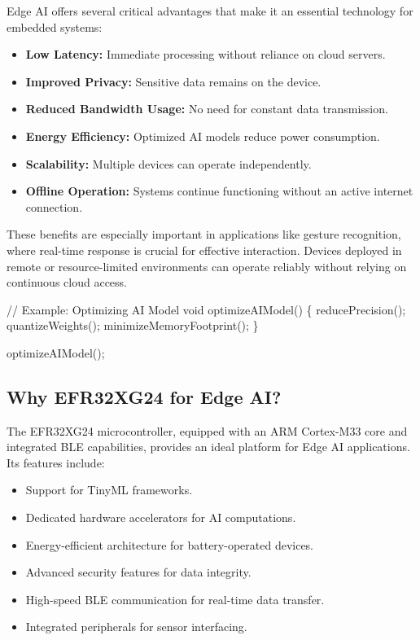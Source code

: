\documentclass[
  9pt,
  letterpaper,
  abstract,
  titlepage]{scrbook}
\newenvironment{Shaded}{\begin{snugshade}}{\end{snugshade}}
\newcommand{\CommentTok}[1]{\textcolor[rgb]{0.37,0.37,0.37}{#1}}
\newcommand{\DataTypeTok}[1]{\textcolor[rgb]{0.68,0.00,0.00}{#1}}
\newcommand{\NormalTok}[1]{\textcolor[rgb]{0.00,0.23,0.31}{#1}}
\newcommand{\OperatorTok}[1]{\textcolor[rgb]{0.37,0.37,0.37}{#1}}
\begin{document}
Edge AI offers several critical advantages that make it an essential
technology for embedded systems:

\begin{itemize}
\item
  \textbf{Low Latency:} Immediate processing without reliance on cloud
  servers.
\item
  \textbf{Improved Privacy:} Sensitive data remains on the device.
\item
  \textbf{Reduced Bandwidth Usage:} No need for constant data
  transmission.
\item
  \textbf{Energy Efficiency:} Optimized AI models reduce power
  consumption.
\item
  \textbf{Scalability:} Multiple devices can operate independently.
\item
  \textbf{Offline Operation:} Systems continue functioning without an
  active internet connection.
\end{itemize}

These benefits are especially important in applications like gesture
recognition, where real-time response is crucial for effective
interaction. Devices deployed in remote or resource-limited environments
can operate reliably without relying on continuous cloud access.

\begin{Shaded}
\begin{Highlighting}[]
\CommentTok{// Example: Optimizing AI Model}
\DataTypeTok{void}\NormalTok{ optimizeAIModel}\OperatorTok{()} \OperatorTok{\{}
\NormalTok{    reducePrecision}\OperatorTok{();}
\NormalTok{    quantizeWeights}\OperatorTok{();}
\NormalTok{    minimizeMemoryFootprint}\OperatorTok{();}
\OperatorTok{\}}

\NormalTok{optimizeAIModel}\OperatorTok{();}
\end{Highlighting}
\end{Shaded}

\subsection{Why EFR32XG24 for Edge AI?}\label{why-efr32xg24-for-edge-ai}

The EFR32XG24 microcontroller, equipped with an ARM Cortex-M33 core and
integrated BLE capabilities, provides an ideal platform for Edge AI
applications. Its features include:

\begin{itemize}
\item
  Support for TinyML frameworks.
\item
  Dedicated hardware accelerators for AI computations.
\item
  Energy-efficient architecture for battery-operated devices.
\item
  Advanced security features for data integrity.
\item
  High-speed BLE communication for real-time data transfer.
\item
  Integrated peripherals for sensor interfacing.
\end{itemize}
\end{document}
